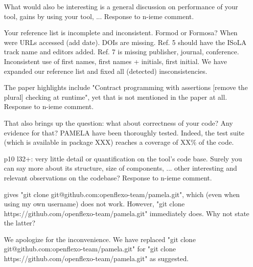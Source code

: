 \documentclass[10pt]{article}
\begin{document}
\begin{response}{What would also be interesting is a general discussion on performance of your tool, gains by using your tool, ...
}
Response to n-ieme comment.
\end{response}

\begin{response}{Your reference list is incomplete and inconsistent. Formod or Formosa? When were URLs accessed (add date). DOIs are missing. Ref. 5 should have the ISoLA track name and editors added. Ref. 7 is missing publisher, journal, conference. Inconsistent use of first names, first names + initials, first initial.}
We have expanded our reference list and fixed all (detected) insconsistencies.
\end{response}

\begin{response}{The paper highlights include "Contract programming with assertions [remove the plural] checking at runtime", yet that is not mentioned in the paper at all.
}
  Response to n-ieme comment.
\end{response}

\begin{response}{That also brings up the question: what about correctness of your code? Any evidence for that?}
PAMELA have been thoroughly tested. Indeed, the test suite (which is available in package XXX) reaches a coverage of XX\% of the code.
\end{response}

\begin{response}{p10 l32+: very little detail or quantification on the tool's code base. Surely you can say more about its structure, size of components, ... other interesting and relevant observations on the codebase?}
  Response to n-ieme comment.
\end{response}


\begin{response}{gives "git clone git@github.com:openflexo-team/pamela.git", which (even when using my own username) does not work. However, "git clone https://github.com/openflexo-team/pamela.git" immediately does. Why not state the latter?
}

We apologize for the inconvenience. We have replaced "git clone git@github.com:openflexo-team/pamela.git" for "git clone https://github.com/openflexo-team/pamela.git" as suggested.
\end{response}
\end{document}
